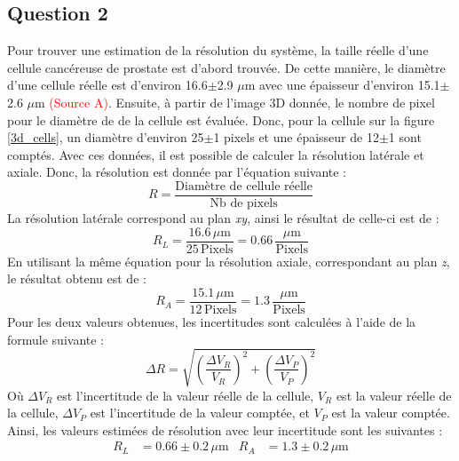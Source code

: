 \documentclass[11pt,letterpaper]{article}
\begin{document}




\subsection{Question 2}
Pour trouver une estimation de la résolution du système, la taille réelle d'une cellule cancéreuse de prostate est d'abord trouvée. De cette manière, le diamètre d'une cellule réelle est d'environ 16.6$\pm$2.9 $\mu$m avec une épaisseur d'environ 15.1$\pm$2.6 $\mu$m  \textcolor{red}{(Source A)}. Ensuite, à partir de l'image 3D donnée, le nombre de pixel pour le diamètre de de la cellule est évaluée. Donc, pour la cellule sur la figure \ref{3d_cells}, un diamètre d'environ 25$\pm$1 pixels et une épaisseur de 12$\pm$1 sont comptés. Avec ces données, il est possible de calculer la résolution latérale et axiale. Donc, la résolution est donnée par l'équation suivante :
\begin{equation}
  R=\frac{\text{Diamètre de cellule réelle}}{\text{Nb de pixels}}
\end{equation}
La résolution latérale correspond au plan \textit{xy}, ainsi le résultat de celle-ci est de :
\begin{equation}
  R_{L}=\frac{16.6\,\mu\mathrm{m}}{25\,\mathrm{Pixels}}=0.66\,\frac{\mu\mathrm{m}}{\mathrm{Pixels}}
\end{equation}
En utilisant la même équation pour la résolution axiale, correspondant au plan \textit{z}, le résultat obtenu est de :
\begin{equation}
  R_{A}=\frac{15.1\,\mu\mathrm{m}}{12\,\mathrm{Pixels}}=1.3\,\frac{\mu\mathrm{m}}{\mathrm{Pixels}}
\end{equation}
Pour les deux valeurs obtenues, les incertitudes sont calculées à l'aide de la formule suivante :
\begin{equation}
  \Delta R=\sqrt{\left(\frac{\Delta V_{R}}{V_{R}}\right)^{2}+\left(\frac{\Delta V_{P}}{V_{P}}\right)^{2}}
\end{equation}
Où $\Delta V_{R}$ est l'incertitude de la valeur réelle de la cellule, $V_{R}$ est la valeur réelle de la cellule, $\Delta V_{P}$ est l'incertitude de la valeur comptée, et $V_{P}$ est la valeur comptée. Ainsi, les valeurs estimées de résolution avec leur incertitude sont les suivantes :
\begin{align*}
  R_{L}&=0.66\pm0.2\,\mu\mathrm{m} & R_{A}&=1.3\pm0.2\,\mu\mathrm{m} \\
\end{align*}
\end{document}
